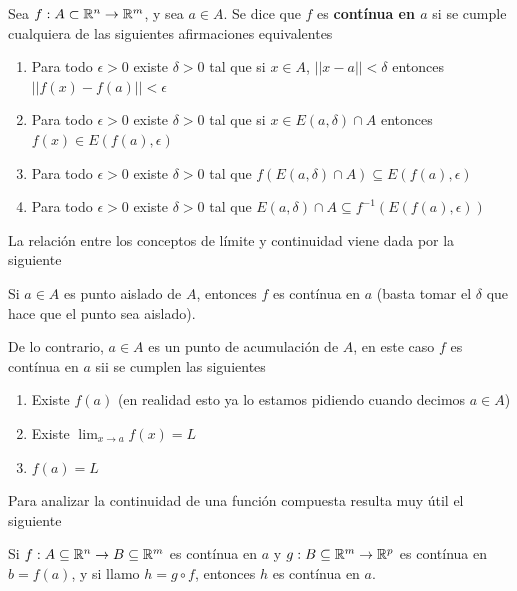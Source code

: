 \begin{definition}[Continuidad]
Sea $ f: A \subset \mathbb{R}^n \to \mathbb{R}^m$, y sea $a \in A$.  Se dice que $f$ es \textbf{contínua en $a$}  si se cumple cualquiera de las siguientes afirmaciones equivalentes

\begin{enumerate} 
\item Para todo $\epsilon > 0$ existe $\delta > 0$ tal que si $x \in A$, $||x-a|| < \delta$ entonces $||f(x) - f(a)|| < \epsilon$

\item Para todo $\epsilon > 0$ existe $\delta > 0$ tal que si $x \in E(a,\delta) \cap A$ entonces $f(x) \in E(f(a),\epsilon)$

\item Para todo $\epsilon > 0$ existe $\delta > 0$ tal que $f(E(a,\delta) \cap A) \subseteq E(f(a),\epsilon)$

\item Para todo $\epsilon > 0$ existe $\delta > 0$ tal que $E(a,\delta) \cap A \subseteq f^{-1}(E(f(a),\epsilon))$
\end{enumerate}
\end{definition}

La relación entre los conceptos de límite y continuidad viene dada por la siguiente

\begin{observation}
Si $a \in A$ es punto aislado de $A$, entonces $f$ es contínua en $a$ (basta tomar el $\delta$ que hace que el punto sea aislado).

De lo contrario, $a \in A$ es un punto de acumulación de $A$, en este caso $f$ es contínua en $a$ sii se cumplen las siguientes

\begin{enumerate}
\item Existe $f(a)$ (en realidad esto ya lo estamos pidiendo cuando decimos $a \in A$)

\item Existe $\displaystyle \lim_{x \to a} f(x) = L$ 

\item $f(a) = L$
\end{enumerate}
\end{observation}

Para analizar la continuidad de una función compuesta resulta muy útil el siguiente 

\begin{theorem}
Si $f : A \subseteq \mathbb{R}^n \to B \subseteq \mathbb{R}^m$ es contínua en $a$ y $ g : B \subseteq \mathbb{R}^m \to \mathbb{R}^p$ es contínua en $b = f(a)$, y si llamo $h = g \circ f$, entonces $h$ es contínua en $a$.
\end{theorem}

